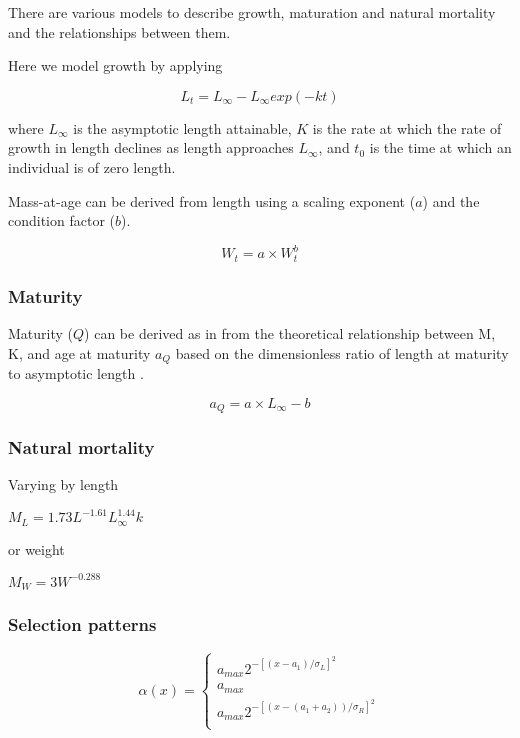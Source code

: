 \documentclass[]{article}
\begin{document}
\begin{itemize}
There are various models to describe growth, maturation and natural mortality and the relationships between them. 
 
Here we model growth by applying \citep{vonbert1957quantitative}   
 
\begin{equation} L_t = L_{\infty} - L_{\infty}exp(-kt) \end{equation} 
 
where $L_{\infty}$ is the asymptotic length attainable, $K$ is the rate at which the rate of growth in length declines as length approaches $L_{\infty}$, and $t_{0}$ is the time at 
which an individual is of zero length. 
 
Mass-at-age can be derived from length using a scaling exponent ($a$) and the condition factor ($b$). 
 
\begin{equation} W_t = a \times W_t^b \end{equation} 
 
\subsubsection{Maturity}

Maturity ($Q$) can be derived as in \citet{williams2003implications} from the theoretical relationship between M, K, and age at maturity $a_{Q}$  
based on the dimensionless ratio of length at maturity to asymptotic length \citep{beverton1992patterns}.  
 
\begin{equation} 
a_{Q}=a \times L_{\infty}-b 
\end{equation}  

\subsubsection{Natural mortality}

Varying by length

$M_L=1.73L^{-1.61}L_{\infty}^{1.44}k$
\citep{gislason2008coexistence}

or weight

$M_W=3W^{-0.288}$
\citep{lorenzen2002density}

\subsubsection{Selection patterns}

\[
    \alpha(x)=\left\{
                \begin{array}{ll}
                  a_{max}2^{-[(x-a_1)/\sigma_{L}]^2}\\
                  a_{max}\\
                  a_{max}2^{-[(x-(a_1+a_2))/\sigma_{R}]^2}\\
                \end{array}
              \right.
  \]
  

\end{itemize}
\end{document}
